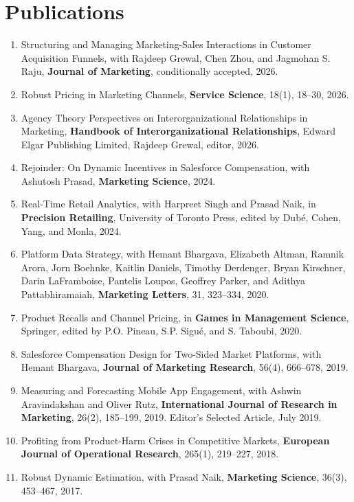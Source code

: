 \documentclass[10pt]{article}
\newcommand{\paper}[1]{\item #1}
\begin{document}
\section{Publications}

\begin{enumerate}
\paper{Structuring and Managing Marketing-Sales Interactions in Customer Acquisition Funnels, with Rajdeep Grewal, Chen Zhou, and Jagmohan S. Raju, \textbf{Journal of Marketing}, conditionally accepted, 2026.}

\paper{Robust Pricing in Marketing Channels, \textbf{Service Science}, 18(1), 18--30, 2026.}

\paper{Agency Theory Perspectives on Interorganizational Relationships in Marketing, \textbf{Handbook of Interorganizational Relationships}, Edward Elgar Publishing Limited, Rajdeep Grewal, editor, 2026.}

\paper{Rejoinder: On Dynamic Incentives in Salesforce Compensation, with Ashutosh Prasad, \textbf{Marketing Science}, 2024.}

\paper{Real-Time Retail Analytics, with Harpreet Singh and Prasad Naik, in \textbf{Precision Retailing}, University of Toronto Press, edited by Dub\'{e}, Cohen, Yang, and Monla, 2024.}

\paper{Platform Data Strategy, with Hemant Bhargava, Elizabeth Altman, Ramnik Arora, Jorn Boehnke, Kaitlin Daniels, Timothy Derdenger, Bryan Kirschner, Darin LaFramboise, Pantelis Loupos, Geoffrey Parker, and Adithya Pattabhiramaiah, \textbf{Marketing Letters}, 31, 323--334, 2020.}

\paper{Product Recalls and Channel Pricing, in \textbf{Games in Management Science}, Springer, edited by P.O. Pineau, S.P. Sigu\'{e}, and S. Taboubi, 2020.}

\paper{Salesforce Compensation Design for Two-Sided Market Platforms, with Hemant Bhargava, \textbf{Journal of Marketing Research}, 56(4), 666--678, 2019.}

\paper{Measuring and Forecasting Mobile App Engagement, with Ashwin Aravindakshan and Oliver Rutz, \textbf{International Journal of Research in Marketing}, 26(2), 185--199, 2019. Editor's Selected Article, July 2019.}

\paper{Profiting from Product-Harm Crises in Competitive Markets, \textbf{European Journal of Operational Research}, 265(1), 219--227, 2018.}

\paper{Robust Dynamic Estimation, with Prasad Naik, \textbf{Marketing Science}, 36(3), 453--467, 2017.}


\end{enumerate}
\end{document}
